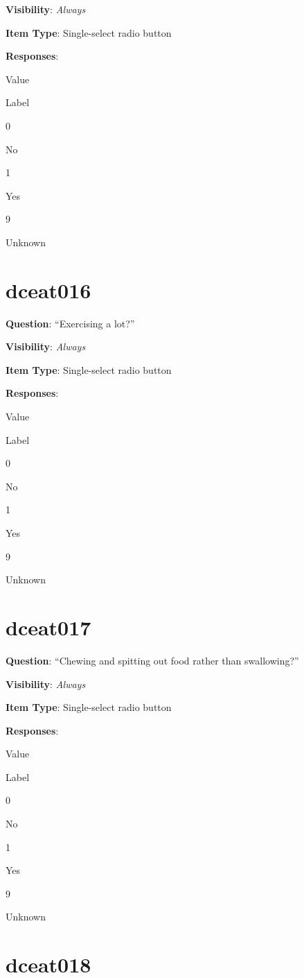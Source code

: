 \documentclass[]{book}
\begin{document}
\textbf{Visibility}: \emph{Always}

\textbf{Item Type}: Single-select radio button

\textbf{Responses}:

Value

Label

0

No

1

Yes

9

Unknown

\hypertarget{dceat016}{%
\section{dceat016}\label{dceat016}}

\textbf{Question}: ``Exercising a lot?''

\textbf{Visibility}: \emph{Always}

\textbf{Item Type}: Single-select radio button

\textbf{Responses}:

Value

Label

0

No

1

Yes

9

Unknown

\hypertarget{dceat017}{%
\section{dceat017}\label{dceat017}}

\textbf{Question}: ``Chewing and spitting out food rather than swallowing?''

\textbf{Visibility}: \emph{Always}

\textbf{Item Type}: Single-select radio button

\textbf{Responses}:

Value

Label

0

No

1

Yes

9

Unknown

\hypertarget{dceat018}{%
\section{dceat018}\label{dceat018}}
\end{document}
